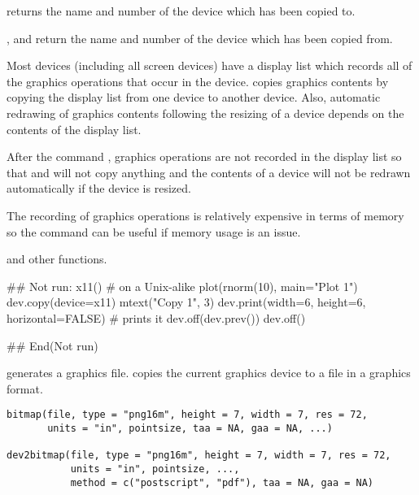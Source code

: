 %
\begin{Value}
 returns the name and number of the device which has
been copied to.

,  and  return
the name and number of the device which has been copied from.
\end{Value}
%
\begin{Note}\relax
Most devices (including all screen devices) have a display list
which records all of the graphics operations that occur in the device.
 copies graphics contents by copying the display list
from one device to another device.  Also, automatic redrawing of
graphics contents following the resizing of a device depends on the
contents of the display list.

After the command , graphics operations
are not recorded in the display list so that  and
 will not copy anything and the contents of a device
will not be redrawn automatically if the device is resized.

The recording of graphics operations is relatively expensive in
terms of memory so the command  can be
useful if memory usage is an issue.
\end{Note}
%
\begin{SeeAlso}\relax
{} and other  functions.
\end{SeeAlso}
%
\begin{Examples}
\begin{ExampleCode}
## Not run: 
x11() # on a Unix-alike
plot(rnorm(10), main="Plot 1")
dev.copy(device=x11)
mtext("Copy 1", 3)
dev.print(width=6, height=6, horizontal=FALSE) # prints it
dev.off(dev.prev())
dev.off()

## End(Not run)
\end{ExampleCode}
\end{Examples}
%
\begin{Description}\relax
{} generates a graphics file.
 copies the current graphics device to a file in a
graphics format.
\end{Description}
%
\begin{Usage}
\begin{verbatim}
bitmap(file, type = "png16m", height = 7, width = 7, res = 72,
       units = "in", pointsize, taa = NA, gaa = NA, ...)

dev2bitmap(file, type = "png16m", height = 7, width = 7, res = 72,
           units = "in", pointsize, ...,
           method = c("postscript", "pdf"), taa = NA, gaa = NA)
\end{verbatim}
\end{Usage}
